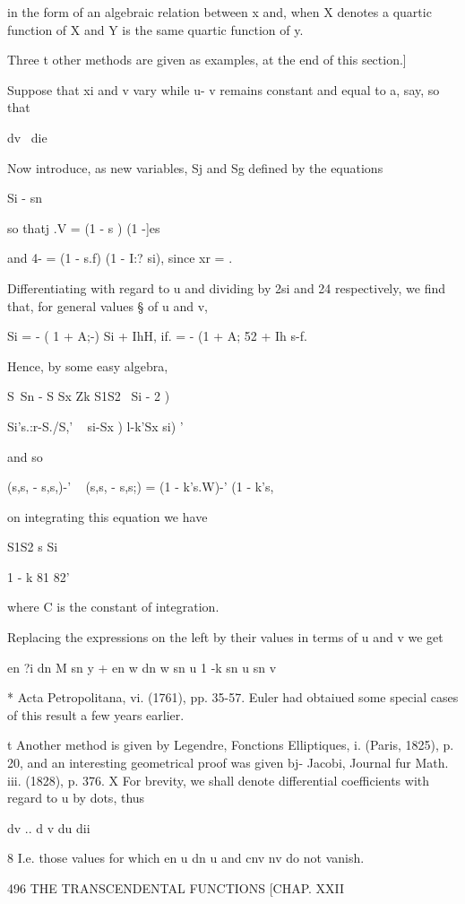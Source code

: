 in the form of an algebraic relation between x and, when X denotes a
quartic function of X and Y is the same quartic function of y.

Three t other methods are given as examples, at the end of this
section.]

Suppose that xi and v vary while u- v remains constant and equal to a,
say, so that

dv \ die

Now introduce, as new variables, Sj and Sg defined by the equations

Si - sn %

so thatj .V = (1 - s ) (1 -]es \

and 4- = (1 - s.f) (1 - I:? si), since xr = .

Differentiating with regard to u and dividing by 2si and 24
respectively, we find that, for general values § of u and v,

Si = - ( 1 + A;-) Si + IhH, if. = - (1 + A; 52 + Ih s-f.

Hence, by some easy algebra,

S\ Sn - S Sx Zk S1S2 \ Si - 2 )

Si's.:r-S./S,' ~ si-Sx ) l-k'Sx si) '

and so

(s,s, - s,s,)-' ~ (s,s, - s,s;) = (1 - k's.W)-' (1 - k's,%

on integrating this equation we have

S1S2 s Si

1 - k 81 82'

where C is the constant of integration.

Replacing the expressions on the left by their values in terms of u
and v we get \

en ?i dn M sn y + en w dn w sn u 1 -k sn u sn v

* Acta Petropolitana, vi. (1761), pp. 35-57. Euler had obtaiued some
special cases of this result a few years earlier.

t Another method is given by Legendre, Fonctions Elliptiques, i.
(Paris, 1825), p. 20, and an interesting geometrical proof was given
bj- Jacobi, Journal fur Math. iii. (1828), p. 376. X For brevity, we
shall denote differential coefficients with regard to u by dots, thus

dv .. d v du dii

8 I.e. those values for which en u dn u and cnv nv do not vanish.

496 THE TRANSCENDENTAL FUNCTIONS [CHAP. XXII

